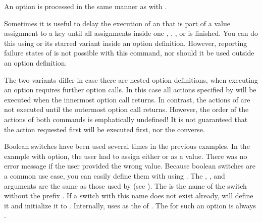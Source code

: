 An  option is processed
in the same manner as with .%
\EndIndexGroup


\begin{Declaration}
\end{Declaration}
Sometimes it is useful to delay the
execution of an  that is part of a value assignment to a key
until all assignments inside one
,
,
, or
 is finished.
You can do this using  or its starred
variant inside an option definition.
However, reporting failure states of  is not possible with this
command, nor should it be used outside an option definition.

The two variants differ in case there are nested option definitions, when
executing an option requires further option calls. In this case all actions
specified by  will be executed when the innermost
option call returns. In contrast, the actions of 
are not executed until the outermost option call returns.
However, the order of the actions of both commands is
emphatically undefined! It is not guaranteed that the action requested first
will be executed first, nor the converse.%
\EndIndexGroup


\begin{Declaration}
\end{Declaration}
Boolean switches have been used several times in the previous examples. In the
example with  option, the user had to assign either
 or  as a value. There was no error message if the
user provided the wrong value. Because boolean switches are a common use case,
you can easily define them with  using .
The , , and  arguments are the same as
those used by  (see
). The  is the
name of the switch without the prefix . If a switch with this name
does not exist already,  will define it and initialize it
to . Internally,  uses 
as the  of . The
 for such an option is always .

